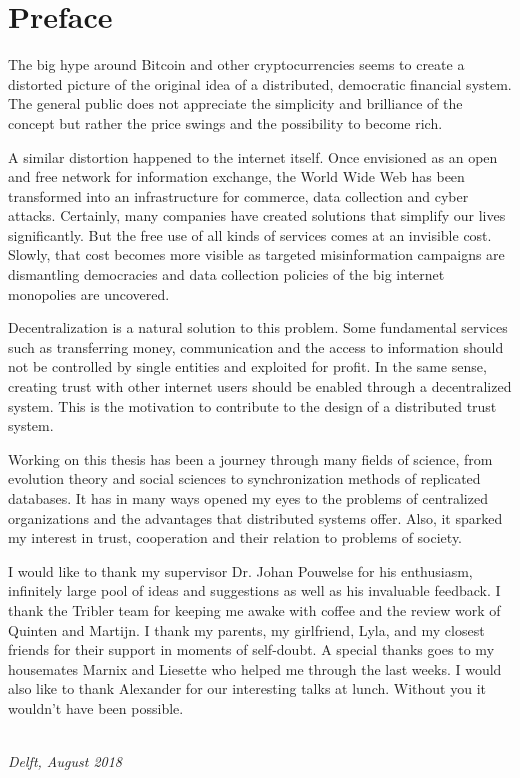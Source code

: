 \chapter*{Preface}

The big hype around Bitcoin and other cryptocurrencies seems to create a distorted picture of the 
original idea of a distributed, democratic financial system. The general public does not appreciate
the simplicity and brilliance of the concept but rather the price swings and the
possibility to become rich. 

A similar distortion happened to the internet itself. Once envisioned as an 
open and free network for information exchange, the World Wide Web has been transformed into an
infrastructure for commerce, data collection and cyber attacks. Certainly, many companies have created 
solutions that simplify our lives significantly. But the free use of all kinds of services comes at 
an invisible cost. Slowly, that cost becomes more visible as targeted misinformation campaigns are
dismantling democracies and data collection policies of the big internet monopolies are uncovered.

Decentralization is a natural solution to this problem. Some fundamental services such as transferring
money, communication and the access to information should not be controlled by single entities and 
exploited for profit. In the same sense, creating trust with other internet users should be 
enabled through a decentralized system. This is the motivation to contribute to the design of a
distributed trust system.

Working on this thesis has been a journey through many fields of science, from evolution theory and 
social sciences to synchronization methods of replicated databases. 
It has in many ways opened my eyes to the problems of centralized 
organizations and the advantages that distributed systems offer. Also, it sparked my interest in 
trust, cooperation and their relation to problems of society.

I would like to thank my supervisor Dr. Johan Pouwelse for his enthusiasm, infinitely large pool of
ideas and suggestions as well as his invaluable feedback. I thank the Tribler team for keeping me 
awake with coffee and the review work of Quinten and Martijn. I thank my parents, my girlfriend, Lyla, 
and my closest friends for their support in moments of self-doubt. A special thanks goes to my 
housemates Marnix and Liesette who helped me through the last weeks. I would also like to thank 
Alexander for our interesting talks at lunch. Without you it wouldn't have been possible.


\begin{flushright}
{\makeatletter\itshape
    \@author \\
    Delft, August 2018
\makeatother}
\end{flushright}

